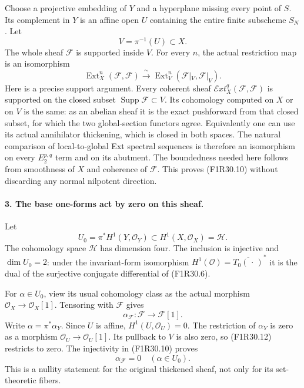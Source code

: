 Choose a projective embedding of $Y$
and a hyperplane missing every point
of $S$. Its complement in $Y$ is an
affine open $U$ containing the entire
finite subscheme $S_N$. Let
\[
                         V=\pi^{-1}(U)\subset X.
 \tag{F1R30.9}
\]
The whole sheaf $\mathcal F$ is supported
inside $V$. For every $n$, the actual
restriction map is an isomorphism
\[
 \operatorname{Ext}^n_X(\mathcal F,\mathcal F)
          \xrightarrow{\ \sim\ }
 \operatorname{Ext}^n_V(\mathcal F|_V,\mathcal F|_V).
 \tag{F1R30.10}
\]
Here is a precise support argument.
Every coherent sheaf
$\mathcal Ext^q_X(\mathcal F,\mathcal F)$
is supported on the closed subset
$\operatorname{Supp}\mathcal F\subset V$.
Its cohomology computed on $X$ or
on $V$ is the same: as an abelian
sheaf it is the exact pushforward
from that closed subset, for which
the two global-section functors agree.
Equivalently one can use its actual
annihilator thickening, which is closed
in both spaces. The natural comparison
of local-to-global Ext spectral sequences
is therefore an isomorphism on every
$E_2^{p,q}$ term and on its abutment.
The boundedness needed here follows
from smoothness of $X$ and coherence
of $\mathcal F$. This proves (F1R30.10)
without discarding any normal nilpotent
direction.

\paragraph{3. The base one-forms act by zero on this sheaf.}
Let
\[
 U_0=\pi^*H^1(Y,\mathcal O_Y)
                   \subset H^1(X,\mathcal O_X)=\mathcal H.
 \tag{F1R30.11}
\]
The cohomology space $\mathcal H$ has
dimension four.
The inclusion is injective and
$\dim U_0=2$: under the invariant-form
isomorphism $H^1(\mathcal O)=
\overline{T_0(\,\cdot\,)}^*$ it is the
dual of the surjective conjugate
differential of (F1R30.6).

For $\alpha\in U_0$, view its usual
cohomology class as the actual morphism
$\mathcal O_X\to\mathcal O_X[1]$.
Tensoring with $\mathcal F$ gives
\[
                   \alpha_{\mathcal F}:
                                  \mathcal F\longrightarrow\mathcal F[1].
 \tag{F1R30.12}
\]
Write $\alpha=\pi^*\alpha_Y$.
Since $U$ is affine,
$H^1(U,\mathcal O_U)=0$.
The restriction of $\alpha_Y$ is zero
as a morphism
$\mathcal O_U\to\mathcal O_U[1]$.
Its pullback to $V$ is also zero,
so (F1R30.12) restricts to zero.
The injectivity in (F1R30.10) proves
\[
                         \alpha_{\mathcal F}=0
                                   \quad(\alpha\in U_0).
 \tag{F1R30.13}
\]
This is a nullity statement for the
original thickened sheaf, not only
for its set-theoretic fibers.

